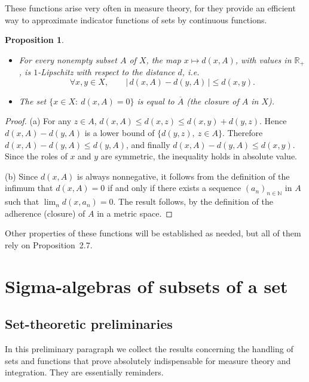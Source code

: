 \documentclass[11pt]{article}
\newtheorem{proposition}{Proposition}[section]
\theoremstyle{definition}
\begin{document}
These functions arise very often in measure theory, for they provide an efficient way to approximate indicator functions of sets by continuous functions.

\begin{proposition}
\begin{itemize}[leftmargin=1.5em]
\item[(a)] For every nonempty subset $A$ of $X$, the map $x\mapsto d(x,A)$, with values in $\mathbb{R}_+$, is $1$-Lipschitz with respect to the distance $d$, i.e.
\[
\forall x,y\in X,\qquad |\,d(x,A)-d(y,A)\,|\le d(x,y).
\]
\item[(b)] The set $\{x\in X:\ d(x,A)=0\}$ is equal to $\overline{A}$ (the closure of $A$ in $X$).
\end{itemize}
\end{proposition}

\begin{proof}
(a) For any $z\in A$, $d(x,A)\le d(x,z)\le d(x,y)+d(y,z)$.
Hence $d(x,A)-d(y,A)$ is a lower bound of $\{d(y,z),\ z\in A\}$.
Therefore $d(x,A)-d(y,A)\le d(y,A)$, and finally $d(x,A)-d(y,A)\le d(x,y)$.
Since the roles of $x$ and $y$ are symmetric, the inequality holds in absolute value.

(b) Since $d(x,A)$ is always nonnegative, it follows from the definition of the infimum that $d(x,A)=0$ if and only if there exists a sequence $(a_n)_{n\in\mathbb{N}}$ in $A$ such that $\lim_{n} d(x,a_n)=0$.
The result follows, by the definition of the adherence (closure) of $A$ in a metric space.
\end{proof}

Other properties of these functions will be established as needed, but all of them rely on Proposition~2.7.

\newpage
\section{Sigma-algebras of subsets of a set}
\subsection{Set-theoretic preliminaries}
In this preliminary paragraph we collect the results concerning the handling of sets and functions that prove absolutely indispensable for measure theory and integration. They are essentially reminders.
\end{document}
